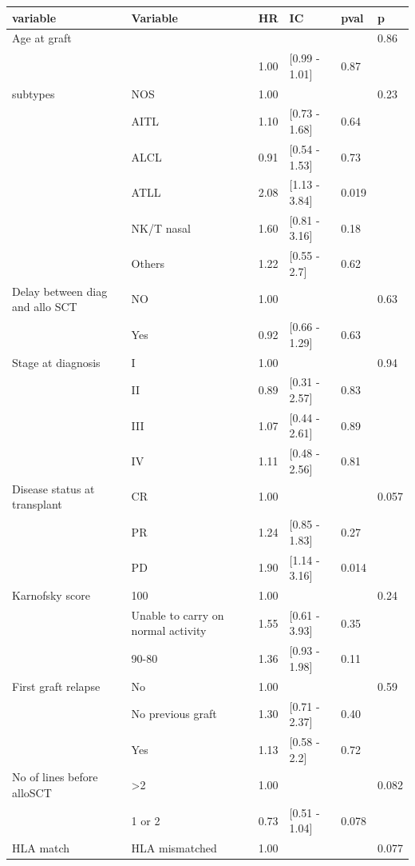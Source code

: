 \documentclass[a4paper,11pt] {article}
\begin{document}
\begin{center}
\begin{landscape}
\begin{longtable}{llrlll}
  \hline
variable & Variable & HR & IC & pval & p \\ 
  \hline
Age at graft &  &  &  &  & 0.86 \\ 
   &  & 1.00 & [0.99 - 1.01] & 0.87 &  \\ 
  subtypes & NOS & 1.00 &  &  & 0.23 \\ 
   & AITL & 1.10 & [0.73 - 1.68] & 0.64 &  \\ 
   & ALCL & 0.91 & [0.54 - 1.53] & 0.73 &  \\ 
   & ATLL & 2.08 & [1.13 - 3.84] & 0.019 &  \\ 
   & NK/T nasal & 1.60 & [0.81 - 3.16] & 0.18 &  \\ 
   & Others & 1.22 & [0.55 - 2.7] & 0.62 &  \\ 
  Delay between diag and allo SCT & NO & 1.00 &  &  & 0.63 \\ 
   & Yes & 0.92 & [0.66 - 1.29] & 0.63 &  \\ 
  Stage at diagnosis & I & 1.00 &  &  & 0.94 \\ 
   & II & 0.89 & [0.31 - 2.57] & 0.83 &  \\ 
   & III & 1.07 & [0.44 - 2.61] & 0.89 &  \\ 
   & IV & 1.11 & [0.48 - 2.56] & 0.81 &  \\ 
  Disease status at transplant & CR & 1.00 &  &  & 0.057 \\ 
   & PR & 1.24 & [0.85 - 1.83] & 0.27 &  \\ 
   & PD & 1.90 & [1.14 - 3.16] & 0.014 &  \\ 
  Karnofsky score & 100 & 1.00 &  &  & 0.24 \\ 
   & Unable to carry on normal activity & 1.55 & [0.61 - 3.93] & 0.35 &  \\ 
   & 90-80 & 1.36 & [0.93 - 1.98] & 0.11 &  \\ 
  First graft relapse & No & 1.00 &  &  & 0.59 \\ 
   & No previous graft & 1.30 & [0.71 - 2.37] & 0.40 &  \\ 
   & Yes & 1.13 & [0.58 - 2.2] & 0.72 &  \\ 
  No of lines before alloSCT & >2 & 1.00 &  &  & 0.082 \\ 
   & 1 or 2 & 0.73 & [0.51 - 1.04] & 0.078 &  \\ 
  HLA match & HLA mismatched & 1.00 &  &  & 0.077 \\ 

\end{longtable}
\end{landscape}
\end{center}
\end{document}
